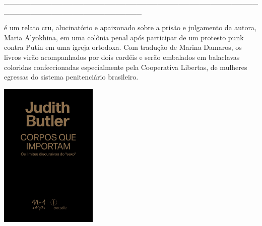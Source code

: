 \hspace*{-2cm}\_\_\_\_\_\_\_\_\_\_\_\_\_\_\_\_\_\_\_\_\_\_\_\_\_\_\_\_\_\_\_\_\_\_\_\_\_\_\_\_\_\_\_\_\_\_\_\_\_\_\_\_\_\_\_\_\_\_\_\_\_\_\_\_\_\_\_\_\_\_\_\_\_\_

\medskip

 é um relato cru, alucinatório e apaixonado sobre a prisão e julgamento da autora, Maria Alyokhina, em uma colônia penal após participar de um protesto punk contra Putin em uma igreja ortodoxa. Com tradução de Marina Damaros, os livros virão acompanhados por dois cordéis e serão embalados em balaclavas coloridas confeccionadas especialmente pela Cooperativa Libertas, de mulheres egressas do sistema penitenciário brasileiro.

\vfill

\hspace*{-.4cm}\begin{minipage}[c]{0.90\linewidth}
\small{
{}}
\end{minipage}

\pagebreak

\hspace{.5cm}

\begin{center}
\hspace*{-.5cm}\includegraphics[width=46.5mm]{./imgs/butler.jpg}
\end{center}

